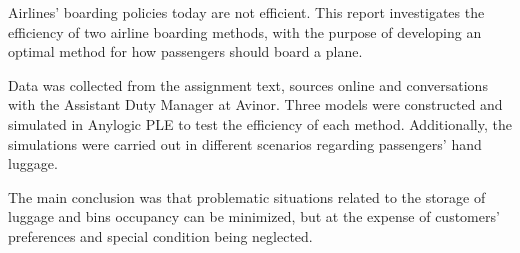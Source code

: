 Airlines' boarding policies today are not efficient. This report investigates the efficiency of two airline boarding methods, with the purpose of developing an optimal method for how passengers should board a plane. 

\indent\newline
Data was collected from the assignment text, sources online and conversations with the Assistant Duty Manager at Avinor. Three models were constructed and simulated in Anylogic PLE to test the efficiency of each method. Additionally, the simulations were carried out in different scenarios regarding passengers' hand luggage. 

\indent\newline
The main conclusion was that problematic situations related to the storage of luggage and bins occupancy can be minimized, but at the expense of customers' preferences and special condition being neglected.

